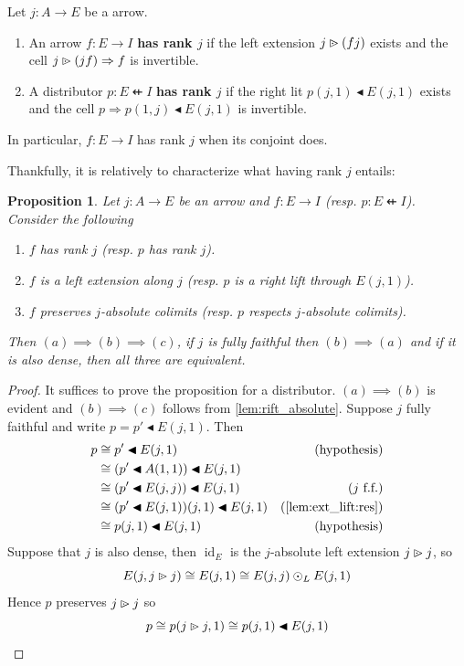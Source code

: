 \documentclass[10pt,a4paper]{article}
\newcommand{\To}{\Rightarrow}
\newcommand{\dfrom}{\nvleftarrow}
\newcommand{\plext}{\mathbin{{\rhd}\mathclap{\mspace{-17.5mu}\cdot}}}
\newcommand{\rift}{\mathbin{\blacktriangleleft}}
\newcommand{\simeqq}{\cong}
\DeclareMathOperator{\id}{id}
\theoremstyle{plain}
\newtheorem{proposition}[theorem]{Proposition}
\theoremstyle{definition}
\theoremstyle{remark}
\begin{document}
\begin{definition}
    Let $j : A \to E$ be a arrow.
    \begin{enumerate}
        \item An arrow $f : E \to I$ \textbf{has rank $j$} if the left extension $j\plext (fj)$ exists and the cell $j\plext(jf)\To f$ is invertible.
        \item A distributor $ p : E \dfrom I$ \textbf{has rank $j$} if the right lit $p(j, 1)\rift E(j, 1)$ exists and the cell $p \To p(1, j)\rift E(j, 1)$ is invertible.
    \end{enumerate}
    In particular, $f : E \to I$ has rank $j$ when its conjoint does.
\end{definition}

Thankfully, it is relatively to characterize what having rank $j$ entails:

\begin{proposition}
    \label{prop:rank_conditions}
    Let $j : A \to E$ be an arrow and $f : E \to I$ (resp. $p : E \dfrom I$). Consider the following
    \begin{enumerate}
        \item $f$ has rank $j$ (resp. $p$ has rank $j$).
        \item $f$ is a left extension along $j$ (resp. $p$ is a right lift through $E(j, 1)$).
        \item $f$ preserves $j$-absolute colimits (resp. $p$ respects $j$-absolute colimits).
    \end{enumerate}
    Then $(a) \implies (b) \implies (c)$, if $j$ is fully faithful then $(b) \implies (a)$ and if it is also dense, then all three are equivalent.
\end{proposition}

\begin{proof}
    It suffices to prove the proposition for a distributor. $(a) \implies (b)$ is evident and $(b) \implies (c)$ follows from \ref{lem:rift_absolute}. Suppose $j$ fully faithful and write $p = p' \rift E(j, 1)$. Then
    \begin{align*}
        p &\simeqq p' \rift E(j, 1) & (\text{hypothesis})\\
          &\simeqq (p' \rift A(1, 1))\rift E(j, 1)\\
          &\simeqq (p' \rift E(j, j))\rift E(j, 1) & (j\text{ f.f.})\\
          &\simeqq (p' \rift E(j, 1))(j, 1)\rift E(j, 1) & (\ref{lem:ext_lift:res})\\
          &\simeqq p(j, 1)\rift E(j, 1) & (\text{hypothesis})
    \end{align*}
    Suppose that $j$ is also dense, then $\id_E$ is the $j$-absolute left extension $j\plext j$, so
    $$E(j, j\plext j) \simeqq E(j, 1) \simeqq E(j, j) \odot_L E(j, 1)$$
    Hence $p$ preserves $j\plext j$ so
    $$p\simeqq p(j\plext j, 1)\simeqq p(j, 1)\rift E(j, 1)$$
\end{proof}
\end{document}
